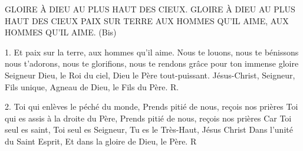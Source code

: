 GLOIRE À DIEU AU PLUS HAUT DES CIEUX. GLOIRE À DIEU AU PLUS HAUT DES CIEUX PAIX SUR TERRE AUX HOMMES QU’IL AIME, AUX HOMMES QU’IL AIME. (Bis)

1. Et paix sur la terre, aux hommes qu’il aime. Nous te louons, nous te bénissons nous t’adorons, nous te glorifions, nous te rendons grâce pour ton immense gloire Seigneur Dieu, le Roi du ciel, Dieu le Père tout-puissant. Jésus-Christ, Seigneur, Fils unique, Agneau de Dieu, le Fils du Père. R.

2. Toi qui enlèves le péché du monde, Prends pitié de nous, reçois nos prières Toi qui es assis à la droite du Père, Prends pitié de nous, reçois nos prières Car Toi seul es saint, Toi seul es Seigneur, Tu es le Très-Haut, Jésus Christ Dans l’unité du Saint Esprit, Et dans la gloire de Dieu, le Père. R
